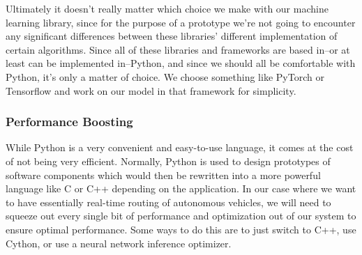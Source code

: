 \documentclass[onecolumn, draftclsnofoot,10pt, compsoc]{IEEEtran}
\begin{document}
Ultimately it doesn't really matter which choice we make with our machine learning library, since for the purpose of a prototype we're not going to encounter any significant differences between these libraries' different implementation of certain algorithms.
Since all of these libraries and frameworks are based in--or at least can be implemented in--Python, and since we should all be comfortable with Python, it's only a matter of choice.
We choose something like PyTorch or Tensorflow and work on our model in that framework for simplicity.
\subsubsection{Performance Boosting}
While Python is a very convenient and easy-to-use language, it comes at the cost of not being very efficient.
Normally, Python is used to design prototypes of software components which would then be rewritten into a more powerful language like C or C++ depending on the application.
In our case where we want to have essentially real-time routing of autonomous vehicles, we will need to squeeze out every single bit of performance and optimization out of our system to ensure optimal performance.
Some ways to do this are to just switch to C++, use Cython, or use a neural network inference optimizer.
\end{document}
